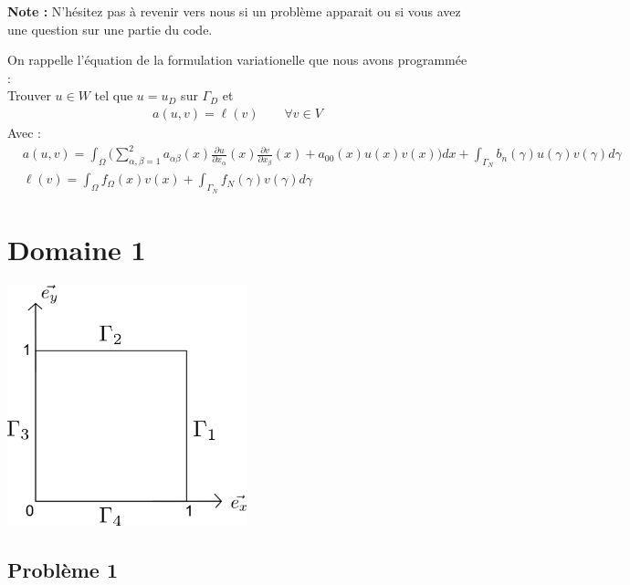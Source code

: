 \documentclass[a4paper, 12pt, french]{report}
\begin{document}
\textbf{Note :} N'hésitez pas à revenir vers nous si un problème apparait ou si vous avez une question sur une partie du code.

\newpage
On rappelle l'équation de la formulation variationelle que nous avons programmée :\\
Trouver $u\in W$ tel que $u = u_D$ sur $\Gamma_D$ et
\begin{align*}
    a(u,v) = \ell(v) \quad \quad  \forall  v\in V
\end{align*}
Avec :
\begin{align}
    &a(u,v) = \int_\Omega \Big( \sum_{\alpha,\beta=1}^{2} a_{\alpha\beta}(x)\frac{\partial u}{\partial x_\alpha}(x)\frac{\partial v}{\partial x_\beta}(x) + a_{00}(x)u(x)v(x) \Big)dx
    +\int_{\Gamma_N}b_n(\gamma)u(\gamma)v(\gamma)d\gamma\\
    &\ell(v) = \int_\Omega f_\Omega(x)v(x)+ \int_{\Gamma_N} f_N(\gamma)v(\gamma)d\gamma
\end{align}

\section{Domaine 1}

\begin{center}
    \includegraphics[height=7cm]{../Images/domaine1.png}
\end{center}

\subsection{Problème 1}
\end{document}
